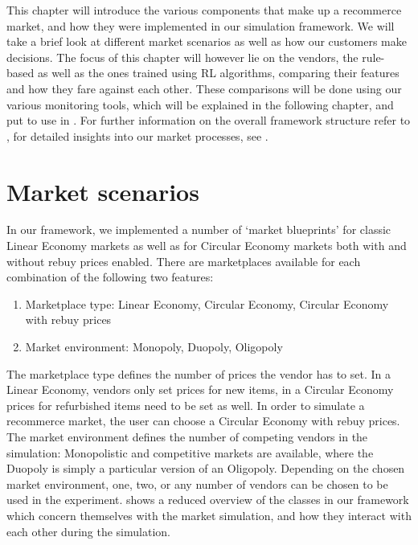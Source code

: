 \begin{jointwork}\label{ch:SimulatingMarketplace}
	This chapter will introduce the various components that make up a recommerce market, and how they were implemented in our simulation framework. We will take a brief look at different market scenarios as well as how our customers make decisions. The focus of this chapter will however lie on the vendors, the rule-based as well as the ones trained using RL algorithms, comparing their features and how they fare against each other. These comparisons will be done using our various monitoring tools, which will be explained in the following chapter,  and put to use in . For further information on the overall framework structure refer to \cite{LeoThesis}, for detailed insights into our market processes, see \cite{NickThesis}.
\end{jointwork}

\section{Market scenarios}\label{sec:MarketScenarios}

In our framework, we implemented a number of `market blueprints' for classic Linear Economy markets as well as for Circular Economy markets both with and without rebuy prices enabled. There are marketplaces available for each combination of the following two features:
\begin{enumerate}
	\item Marketplace type: Linear Economy, Circular Economy, Circular Economy with rebuy prices
	\item Market environment: Monopoly, Duopoly, Oligopoly
\end{enumerate}
The marketplace type defines the number of prices the vendor has to set. In a Linear Economy, vendors only set prices for new items, in a Circular Economy prices for refurbished items need to be set as well. In order to simulate a recommerce market, the user can choose a Circular Economy with rebuy prices. The market environment defines the number of competing vendors in the simulation: Monopolistic and competitive markets are available, where the Duopoly is simply a particular version of an Oligopoly. Depending on the chosen market environment, one, two, or any number of vendors can be chosen to be used in the experiment.  shows a reduced overview of the classes in our framework which concern themselves with the market simulation, and how they interact with each other during the simulation.

